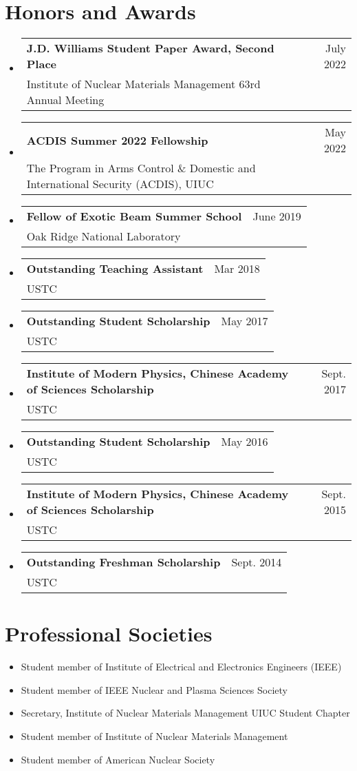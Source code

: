 \documentclass[letterpaper,11pt]{article} %
\makeatletter
\newcommand{\CVSubheading}[4]{
  \vspace{-2pt}\item
    \begin{tabular*}{0.97\textwidth}[t]{l@{\extracolsep{\fill}}r}
      \textbf{#1} & #2 \\
      \small#3 & \small #4 \\
    \end{tabular*}\vspace{-7pt}
}
\newcommand{\CVSubHeadingListStart}{\begin{itemize}[leftmargin=0.5cm, label={}]}
\newcommand{\CVSubHeadingListEnd}{\end{itemize}}
\makeatother
\begin{document}
\section{Honors and Awards}
\CVSubHeadingListStart
    \CVSubheading
          {J.D. Williams Student Paper Award, Second Place}{July 2022}
          {Institute of Nuclear Materials Management 63rd Annual Meeting}{}
    \CVSubheading
          {ACDIS Summer 2022 Fellowship}{May 2022}
          {The Program in Arms Control \& Domestic and International Security (ACDIS), UIUC}{}
    \CVSubheading
          {Fellow of Exotic Beam Summer School}{June 2019}
          {Oak Ridge National Laboratory}{}
    \CVSubheading
          {Outstanding Teaching Assistant}{Mar 2018}
          {USTC}{}
    \CVSubheading
          {Outstanding Student Scholarship}{May 2017}
          {USTC}{}
    \CVSubheading
          {Institute of Modern Physics, Chinese Academy of Sciences Scholarship}{Sept. 2017}
          {USTC}{}
    \CVSubheading
          {Outstanding Student Scholarship}{May 2016}
          {USTC}{}
    \CVSubheading
          {Institute of Modern Physics, Chinese Academy of Sciences Scholarship}{Sept. 2015}
          {USTC}{}
    \CVSubheading
          {Outstanding Freshman Scholarship}{Sept. 2014}
          {USTC}{}
\CVSubHeadingListEnd

\section{Professional Societies}
\begin{itemize}
    \item Student member of Institute of Electrical and Electronics Engineers (IEEE)
    \item Student member of IEEE Nuclear and Plasma Sciences Society
    \item Secretary, Institute of Nuclear Materials Management UIUC Student Chapter
    \item Student member of Institute of Nuclear Materials Management
    \item Student member of American Nuclear Society
\end{itemize}
\end{document}
